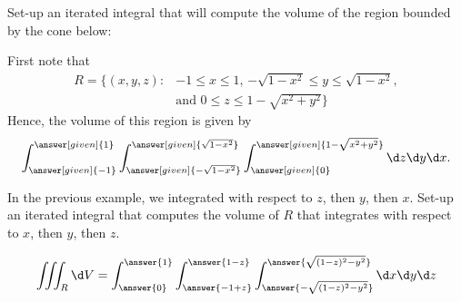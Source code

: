 \documentclass{ximera}
\begin{document}
\begin{example}
  Set-up an iterated integral that will compute the volume of the region
  bounded by the cone below:
  \begin{image}
  \end{image}
  \begin{explanation}
    First note that 
    \begin{align*}
      R=\{(x,y,z):&\text{$-1\leq x\leq 1$, $-\sqrt{1-x^2}\leq y\leq \sqrt{1-x^2}$}, \\
        &\text{and $0\leq z \leq 1-\sqrt{x^2+y^2}$}\}
    \end{align*}
    Hence, the volume of this region is given by
    \[
    \int_{\answer[given]{-1}}^{\answer[given]{1}}
    \int_{\answer[given]{-\sqrt{1-x^2}}}^{\answer[given]{\sqrt{1-x^2}}}
    \int_{\answer[given]{0}}^{\answer[given]{1-\sqrt{x^2+y^2}}}\d z \d y\d x.
    \]
    \end{explanation}
\end{example}

\begin{question}
  In the previous example, we integrated with respect to $z$, then
  $y$, then $x$. Set-up an iterated integral that computes the volume
  of $R$ that integrates with respect to $x$, then $y$, then $z$.
  \begin{prompt}
    \[
    \iiint_R \d V =
    \int_{\answer{0}}^{\answer{1}}
    \int_{\answer{-1+z}}^{\answer{1-z}}
    \int_{\answer{-\sqrt{(1-z)^2-y^2}}}^{\answer{\sqrt{(1-z)^2-y^2}}}
    \d x \d y \d z
    \]
  \end{prompt}
\end{question}
\end{document}
